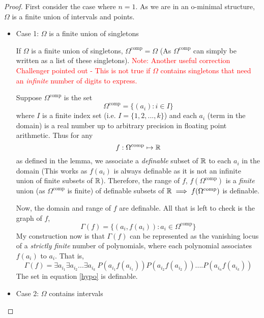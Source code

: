 \begin{proof}
    First consider the case where $n = 1$. As we are in an o-minimal structure, $\Omega$ is a finite union of intervals and points.
    \begin{itemize}
        \item Case 1: $\Omega$ is a finite union of singletons

        If $\Omega$ is a finite union of singletons, $\Omega^\text{comp} = \Omega$ (As $\Omega^\text{comp}$ can simply be written as a list of these singletons). 
        \textcolor{red}{Note: Another useful correction Challenger pointed out - This is not true if $\Omega$ contains singletons that need an \textit{infinite} number of digits to express.}
        
        Suppose $\Omega^\text{comp}$ is the set
        \begin{equation*}
            \Omega^\text{comp} = \{(a_i) : i\in I\} 
        \end{equation*}
        where $I$ is a finite index set (i.e. $I = \{1, 2, ..., k\}$) and each $a_i$ (term in the domain) is a real number up to arbitrary precision in floating point arithmetic.
        Thus for any
        \begin{equation*}
            f:\Omega^\text{comp}\mapsto\mathbb{R}
        \end{equation*}
        as defined in the lemma, we associate a \textit{definable} subset of $\mathbb{R}$ to each $a_i$ in the domain (This works as $f(a_i)$ is always definable as it is not an infinite union of finite subsets of $\mathbb{R}$). Therefore, the range of $f$, $f(\Omega^\text{comp})$ is a \textit{finite} union (as $\Omega^\text{comp}$ is finite) of definable subsets of $\mathbb{R}\implies f(\Omega^\text{comp})$ is definable.
        \par Now, the domain and range of $f$ are definable. All that is left to check is the graph of $f$,
        \begin{equation*}
            \Gamma(f) = \{(a_i, f(a_i)): a_i\in\Omega^\text{comp}\}
        \end{equation*}
        My construction now is that $\Gamma(f)$ can be represented as the vanishing locus of a \textit{strictly finite} number of polynomials, where each polynomial associates $f(a_i)$ to $a_i$. That is,
        \begin{equation}
        \label{hypo}
            \Gamma(f) = \exists a_{i_1}\exists a_{i_2}...\exists a_{i_k}\: P(a_{i_1}f(a_{i_1}))P(a_{i_2}f(a_{i_2}))....P(a_{i_n}f(a_{i_k}))
        \end{equation}
        The set in equation \ref{hypo} is definable.
        \item Case 2: $\Omega$ contains intervals


\end{itemize}
\end{proof}
